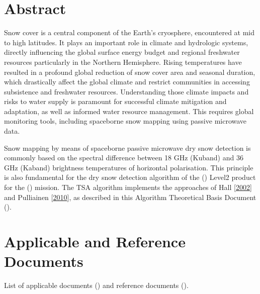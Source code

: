 \documentclass[letterpaper,10pt,english]{jupyterBook}
\begin{document}
\sphinxstepscope


\chapter{Abstract}
\label{\detokenize{book/abstract:abstract}}\label{\detokenize{book/abstract::doc}}
\sphinxAtStartPar
Snow cover is a central component of the Earth’s cryosphere, encountered at mid to high latitudes.
It plays an important role in climate and hydrologic systems, directly influencing the global surface energy budget and regional freshwater resources particularly in the Northern Hemisphere.
Rising temperatures have resulted in a profound global reduction of snow cover area and seasonal duration, which drastically affect the global climate and restrict communities in accessing subsistence and freshwater resources.
Understanding those climate impacts and risks to water supply is paramount for successful climate mitigation and adaptation, as well as informed water resource management.
This requires global monitoring tools, including spaceborne snow mapping using passive microwave data.

\sphinxAtStartPar
Snow mapping by means of spaceborne passive microwave dry snow detection is commonly based on the spectral difference between 18 GHz (Ku\sphinxhyphen{}band) and 36 GHz (Ka\sphinxhyphen{}band) brightness temperatures of horizontal polarisation.
This principle is also fundamental for the dry snow detection algorithm of the {\hyperref[\detokenize{book/definitions:term-Terrestrial-snow-area}]{}} ({\hyperref[\detokenize{book/acronyms:term-TSA}]{}}) Level\sphinxhyphen{}2 product for the {\hyperref[\detokenize{book/definitions:term-Copernicus-Imaging-Microwave-Radiometer}]{}} ({\hyperref[\detokenize{book/acronyms:term-CIMR}]{}}) mission.
The TSA algorithm implements the approaches of Hall  {[}\hyperlink{cite.book/references:id2}{2002}{]} and Pulliainen  {[}\hyperlink{cite.book/references:id3}{2010}{]}, as described in this Algorithm Theoretical Basis Document ({\hyperref[\detokenize{book/acronyms:term-ATBD}]{}}).

\sphinxstepscope


\chapter{Applicable and Reference Documents}
\label{\detokenize{book/applicable_ref_docs:applicable-and-reference-documents}}\label{\detokenize{book/applicable_ref_docs::doc}}
\sphinxAtStartPar
List of applicable documents ({\hyperref[\detokenize{book/acronyms:term-AD}]{}}) and reference documents ({\hyperref[\detokenize{book/acronyms:term-RD}]{}}).
\end{document}
